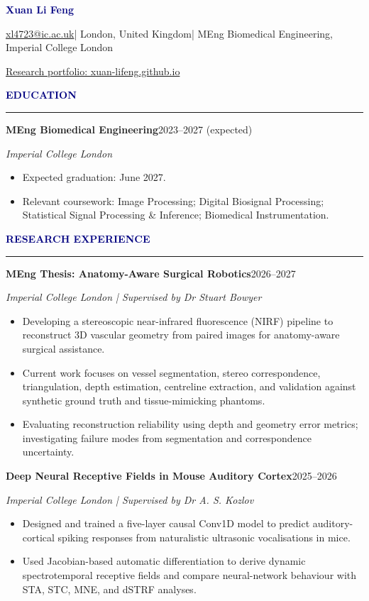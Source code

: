 \documentclass[10pt,a4paper]{article}
\newcommand{\sectiontitle}[1]{\par\vspace{3pt}\textcolor{navy}{\large\textbf{#1}}\par\vspace{-3pt}\textcolor{navy}{\rule{\linewidth}{0.45pt}}\vspace{0pt}}
\newcommand{\entry}[2]{\textbf{#1}\hfill{\color{black!65}#2}\par}
\begin{document}
\fontsize{9.5}{10.5}\selectfont
\begin{center}
{\fontsize{19}{20}\selectfont\textcolor{navy}{\textbf{Xuan Li Feng}}}\par\vspace{2pt}
\href{mailto:xl4723@ic.ac.uk}{xl4723@ic.ac.uk}\quad | \quad London, United Kingdom\quad | \quad MEng Biomedical Engineering, Imperial College London\par
\vspace{1pt}\href{https://xuan-lifeng.github.io}{Research portfolio: xuan-lifeng.github.io}
\end{center}\vspace{-5pt}
\sectiontitle{EDUCATION}
\entry{MEng Biomedical Engineering}{2023--2027 (expected)}
\textit{Imperial College London}
\begin{itemize}
\item Expected graduation: June 2027.
\item Relevant coursework: Image Processing; Digital Biosignal Processing; Statistical Signal Processing \& Inference; Biomedical Instrumentation.
\end{itemize}
\sectiontitle{RESEARCH EXPERIENCE}
\entry{MEng Thesis: Anatomy-Aware Surgical Robotics}{2026--2027}
\textit{Imperial College London \quad | \quad Supervised by Dr Stuart Bowyer}
\begin{itemize}
\item Developing a stereoscopic near-infrared fluorescence (NIRF) pipeline to reconstruct 3D vascular geometry from paired images for anatomy-aware surgical assistance.
\item Current work focuses on vessel segmentation, stereo correspondence, triangulation, depth estimation, centreline extraction, and validation against synthetic ground truth and tissue-mimicking phantoms.
\item Evaluating reconstruction reliability using depth and geometry error metrics; investigating failure modes from segmentation and correspondence uncertainty.
\end{itemize}
\entry{Deep Neural Receptive Fields in Mouse Auditory Cortex}{2025--2026}
\textit{Imperial College London \quad | \quad Supervised by Dr A. S. Kozlov}
\begin{itemize}
\item Designed and trained a five-layer causal Conv1D model to predict auditory-cortical spiking responses from naturalistic ultrasonic vocalisations in mice.
\item Used Jacobian-based automatic differentiation to derive dynamic spectrotemporal receptive fields and compare neural-network behaviour with STA, STC, MNE, and dSTRF analyses.
\end{itemize}
\end{document}
